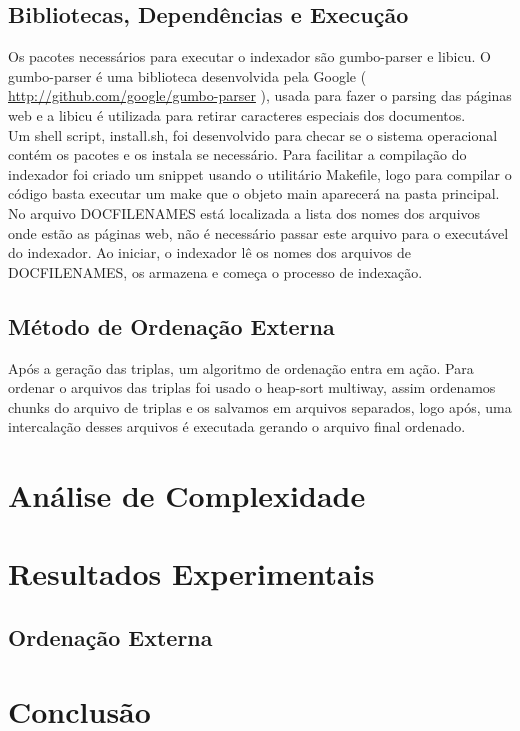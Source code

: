 \documentclass[11pt]{article}
\begin{document}
\subsection{Bibliotecas, Dependências e Execução}
Os pacotes necessários para executar o indexador são gumbo-parser e libicu. O gumbo-parser  é uma biblioteca desenvolvida pela Google ( \url{http://github.com/google/gumbo-parser} ), usada para fazer o parsing das páginas web e a libicu é utilizada para retirar caracteres especiais dos documentos.\\
Um shell script, install.sh, foi desenvolvido para checar se o sistema operacional contém os pacotes e os instala se necessário.
Para facilitar a compilação do indexador foi criado um snippet usando o utilitário Makefile, logo para compilar o código basta executar um make que o objeto main aparecerá na pasta principal.\\
No arquivo DOCFILENAMES está localizada a lista dos nomes dos arquivos onde estão as páginas web, não é necessário passar este arquivo para o executável do indexador. Ao iniciar, o indexador lê os nomes dos arquivos de DOCFILENAMES, os armazena e começa o processo de indexação.

\subsection{Método de Ordenação Externa}
Após a geração das triplas, um algoritmo de ordenação entra em ação. Para ordenar o arquivos das triplas foi usado o heap-sort multiway, assim ordenamos chunks do arquivo de triplas e os salvamos em arquivos separados, logo após, uma intercalação desses arquivos é executada gerando o arquivo final ordenado.\\


\section{Análise de Complexidade}

% 


\section{Resultados Experimentais}
\subsection{Ordenação Externa}
% 
% 
% 
% 


\section{Conclusão}
% 
% 
% 
% 
% 
\end{document}
